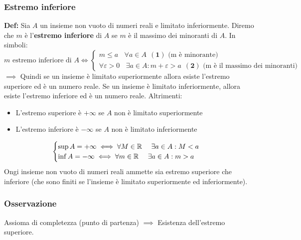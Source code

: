\subsubsection{Estremo inferiore}
\textbf{Def:} Sia $A$ un insieme non vuoto di numeri reali e limitato inferiormente. Diremo che $m$ è l'\textbf{estremo inferiore} di $A$ se $m$ è il massimo dei minoranti di $A$. In simboli:
\[
    m \text{ estremo inferiore di } A \iff \begin{cases}
        m \leq a  \ \ \ \ \forall a \in A \ \ (\textbf{1}) \text{ (m è minorante)} \\
        \forall \varepsilon > 0 \ \ \ \ \exists a \in A : m + \varepsilon > a \ \ (\textbf{2}) \text{ (m è il massimo dei minoranti)}
    \end{cases}
\]
$\implies$ Quindi se un insieme è limitato superiormente allora esiste l'estremo superiore ed è un numero reale. Se un insieme è limitato inferiormente, allora esiste l'estremo inferiore ed è un numero reale.
Altrimenti:
\begin{itemize}
    \item L'estremo superiore è $+\infty$ se $A$ non è limitato superiormente
    \item L'estremo inferiore è $-\infty$ se $A$ non è limitato inferiormente
\end{itemize}
\[
    \begin{cases}
        \sup A = +\infty \iff \forall M \in \mathbb{R} \ \ \ \ \exists a \in A : M < a \\
        \inf A = -\infty \iff \forall m \in \mathbb{R} \ \ \ \ \exists a \in A : m > a
    \end{cases}
\]
Ongi insieme non vuoto di numeri reali ammette sia estremo superiore che
inferiore (che sono finiti se l'insieme è limitato superiormente ed
inferiormente).

\subsubsection{Osservazione}
Assioma di completezza (punto di partenza) $\implies$ Esistenza dell'estremo
superiore.